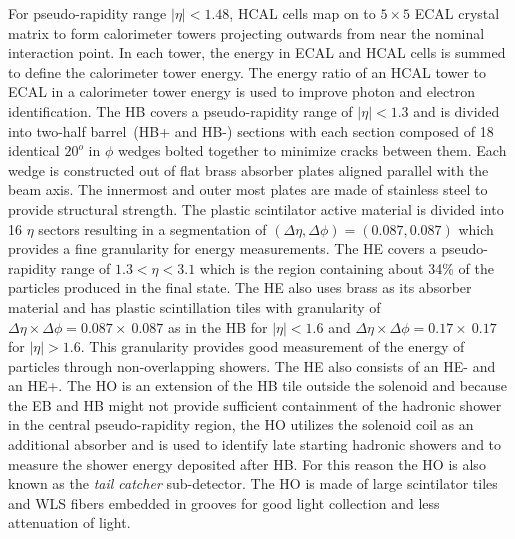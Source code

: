 \newline
For pseudo-rapidity range $\vert \eta \vert < 1.48$, HCAL cells map on to $5\times5$ ECAL crystal matrix to form calorimeter towers projecting  outwards from near the nominal interaction point. In each tower, the energy in ECAL and HCAL cells is summed to define the calorimeter tower energy. The energy ratio of an HCAL tower to ECAL in a calorimeter tower energy is used to improve photon and electron identification. 
\newline 
The HB covers a pseudo-rapidity range of $|\eta| < 1.3$ and is divided into two-half barrel~(HB+ and HB-) sections with each section composed of 18 identical $20^{o}$ in $\phi$ wedges bolted together to minimize cracks between them. Each wedge is constructed out of flat brass absorber plates aligned parallel with the beam axis. The innermost and outer most plates are made of stainless steel to provide structural strength. The plastic scintilator active material is divided into 16 $\eta$ sectors resulting in a segmentation of $(\Delta\eta, \Delta\phi) =(0.087, 0.087)$ which provides a fine granularity for energy measurements.
\newline
The HE covers a pseudo-rapidity range of $1.3 < \eta < 3.1$ which is the region containing about 34\% of the particles produced in the final state. The HE also uses brass as its absorber material and has plastic scintillation tiles with granularity of $\Delta\eta\times\Delta\phi = 0.087 \times\ 0.087$ as in the HB for $|\eta| < 1.6$  and  $\Delta\eta\times\Delta\phi = 0.17 \times\ 0.17$ for $|\eta| > 1.6$.  This granularity provides good measurement of the energy of particles through non-overlapping showers. The HE also consists of an HE- and an HE+. 
\newline
The HO is an extension of the HB tile outside the solenoid and because the EB and HB might not provide sufficient containment of the hadronic shower in the central pseudo-rapidity region, the HO utilizes the solenoid coil as an additional absorber and is used to identify late starting hadronic showers and to measure the shower energy deposited after HB. For this reason the HO is also known as the \textit{tail catcher} sub-detector. The HO is made of large scintilator tiles and WLS fibers embedded in grooves for good light collection and less attenuation of light.
